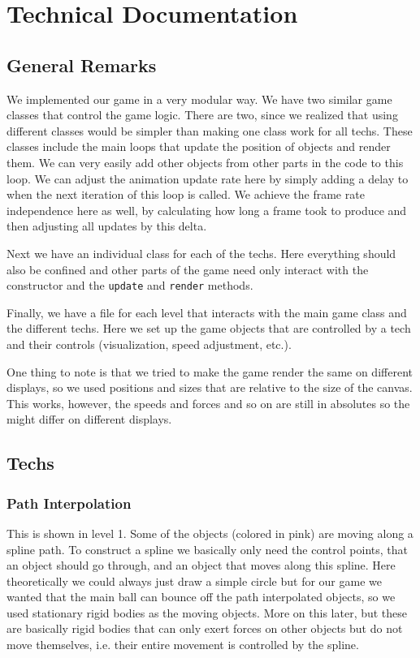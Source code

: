 \documentclass{article}
\begin{document}
\section{Technical Documentation}

\subsection{General Remarks}
We implemented our game in a very modular way. We have two similar game classes that control the game logic. There are two, since we realized that using different classes would be simpler than making one class work for all techs. These classes include the main loops that 
update the position of objects and render them. We can very easily add other objects from other parts in the 
code to this loop. We can adjust the animation update rate here 
by simply adding a delay to when the next iteration of this loop is called. 
We achieve the frame rate independence here as well, by calculating how long a frame took to produce 
and then adjusting all updates by this delta. 

Next we have an individual class for each of the techs. Here everything should 
also be confined and other parts of the game need only interact with the constructor
and the \texttt{update} and \texttt{render} methods.

Finally, we have a file for each level that interacts with the main game 
class and the different techs. Here we set up
the game objects that are controlled by a tech and their controls (visualization, speed adjustment, etc.).

One thing to note is that we tried to make the game render the same on different displays, so we used 
positions and sizes that are relative to the size of the canvas. This works, however, the speeds and forces and so 
on are still in absolutes so the might differ on different displays.

\subsection{Techs}



\subsubsection{Path Interpolation}

This is shown in level 1. Some of the objects (colored in pink) are moving along a spline path. 
To construct a spline we basically only need the control points, that an object should go through, and an 
object that moves along this spline. Here theoretically we could always just draw a simple circle but 
for our game we wanted that the main ball can bounce off the path interpolated objects, so we used stationary rigid bodies
as the moving objects. More on this later, but these are basically rigid bodies that can only 
exert forces on other objects but do not move themselves, i.e. their entire movement is controlled by the spline.
\end{document}
